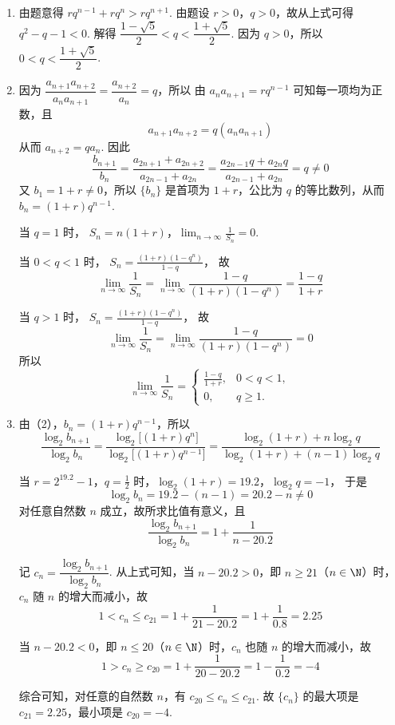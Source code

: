 \documentclass[UTF8,a4paper,oneside,11pt]{ctexbook}
\begin{document}
\begin{solution}
\begin{enumerate}
\item 由题意得 \(r q^{n - 1} + rq^n > rq^{n + 1}\).
由题设 \(r > 0\)，\(q > 0\)，故从上式可得 \(q^2 - q - 1 < 0\).
解得 \(\dfrac{1 - \sqrt{5}}{2} < q < \dfrac{1 + \sqrt{5}}{2}\).
因为 \(q > 0\)，所以 \(0 < q < \dfrac{1 + \sqrt{5}}{2}\).

\item 因为 \(\dfrac{a_{n + 1}a_{n + 2}}{a_n a_{n + 1}} = \dfrac{a_{n + 2}}{a_n} = q\)，所以
由 \(a_na_{n+1}=rq^{n-1}\) 可知每一项均为正数，且
\[
a_{n+1}a_{n+2}=q(a_na_{n+1})
\]
从而 \(a_{n+2}=qa_n\). 因此
\[
\frac{b_{n + 1}}{b_n}
= \frac{a_{2n + 1} + a_{2n + 2}}{a_{2n - 1} + a_{2n}}
= \frac{a_{2n - 1}q + a_{2n}q}{a_{2n - 1} + a_{2n}}
= q \neq 0
\]
又 \(b_1 = 1 + r \neq 0\)，所以 \(\{b_n\}\) 是首项为 \(1 + r\)，公比为 \(q\) 的等比数列，从而 \(b_n = (1 + r)q^{n - 1}\).

当 \(q = 1\) 时，
\(S_n = n(1 + r)\)，\(\displaystyle\lim_{n \to \infty}\frac{1}{S_n} = 0\).

当 \(0 < q < 1\) 时，
\(S_n = \frac{(1 + r)(1 - q^n)}{1 - q}\)，
故
\[
\displaystyle\lim_{n \to \infty}\frac{1}{S_n}
= \displaystyle\lim_{n \to \infty}\frac{1 - q}{(1 + r)(1 - q^n)}
= \frac{1 - q}{1 + r}
\]

当 \(q > 1\) 时，
\(S_n = \frac{(1 + r)(1 - q^n)}{1 - q}\)，
故
\[
\displaystyle\lim_{n \to \infty}\frac{1}{S_n}
= \displaystyle\lim_{n \to \infty}\frac{1 - q}{(1 + r)(1 - q^n)}
= 0
\]
所以
\[
\displaystyle\lim_{n \to \infty}\frac{1}{S_n}
=
\begin{cases}
\frac{1 - q}{1 + r}, & 0 < q < 1,\\
0, & q \geqslant 1.
\end{cases}
\]

\item 由（2），\(b_n = (1 + r)q^{n - 1}\)，所以
\[
\frac{\log_2 b_{n + 1}}{\log_2 b_n}
= \frac{\log_2\bigl[(1 + r)q^n\bigr]}{\log_2\bigl[(1 + r)q^{n - 1}\bigr]}
= \frac{\log_2(1 + r) + n\log_2 q}{\log_2(1 + r) + (n - 1)\log_2 q}
\]

当 \(r = 2^{19.2} - 1\)，\(q = \frac{1}{2}\) 时，\(\log_2(1 + r) = 19.2\)，\(\log_2 q = -1\)，
于是
\[
\log_2 b_n=19.2-(n-1)=20.2-n\neq 0
\]
对任意自然数 \(n\) 成立，故所求比值有意义，且
\[
\dfrac{\log_2 b_{n + 1}}{\log_2 b_n} = 1 + \dfrac{1}{n - 20.2}
\]

记 \(c_n = \dfrac{\log_2 b_{n + 1}}{\log_2 b_n}\).
从上式可知，当 \(n - 20.2 > 0\)，即 \(n \geqslant 21\)（\(n \in \N\)）时，\(c_n\) 随 \(n\) 的增大而减小，故
\[
1 < c_n \leqslant c_{21}
= 1 + \frac{1}{21 - 20.2}
= 1 + \frac{1}{0.8}
= 2.25
\]

当 \(n - 20.2 < 0\)，即 \(n \leqslant 20\)（\(n \in \N\)）时，\(c_n\) 也随 \(n\) 的增大而减小，故
\[
1 > c_n \geqslant c_{20}
= 1 + \frac{1}{20 - 20.2}
= 1 - \frac{1}{0.2}
= -4
\]

综合可知，对任意的自然数 \(n\)，有 \(c_{20} \leqslant c_n \leqslant c_{21}\).
故 \(\{c_n\}\) 的最大项是 \(c_{21} = 2.25\)，最小项是 \(c_{20} = -4\).
\end{enumerate}
\end{solution}

\end{document}
